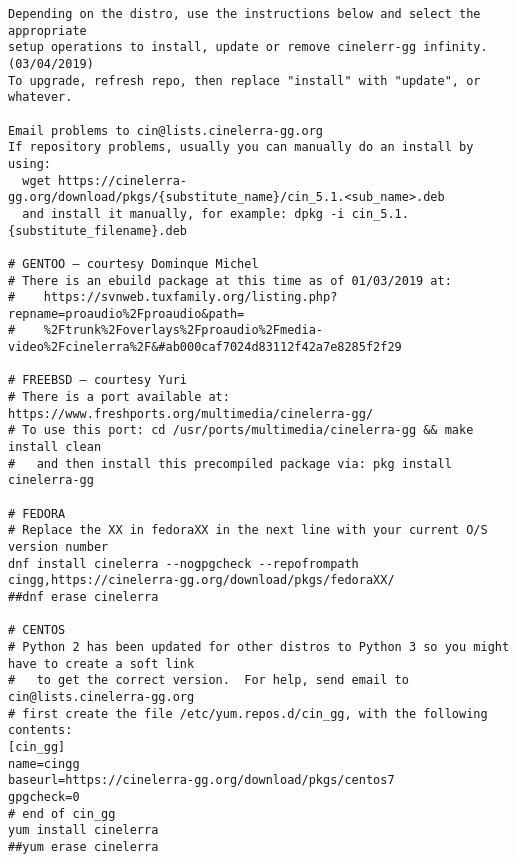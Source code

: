 \begin{lstlisting}
Depending on the distro, use the instructions below and select the appropriate 
setup operations to install, update or remove cinelerr-gg infinity.  (03/04/2019)
To upgrade, refresh repo, then replace "install" with "update", or whatever.

Email problems to cin@lists.cinelerra-gg.org
If repository problems, usually you can manually do an install by using:
  wget https://cinelerra-gg.org/download/pkgs/{substitute_name}/cin_5.1.<sub_name>.deb
  and install it manually, for example: dpkg -i cin_5.1.{substitute_filename}.deb

# GENTOO – courtesy Dominque Michel
# There is an ebuild package at this time as of 01/03/2019 at:
#    https://svnweb.tuxfamily.org/listing.php?repname=proaudio%2Fproaudio&path=
#    %2Ftrunk%2Foverlays%2Fproaudio%2Fmedia-video%2Fcinelerra%2F&#ab000caf7024d83112f42a7e8285f2f29

# FREEBSD – courtesy Yuri
# There is a port available at: https://www.freshports.org/multimedia/cinelerra-gg/
# To use this port: cd /usr/ports/multimedia/cinelerra-gg && make install clean
#   and then install this precompiled package via: pkg install cinelerra-gg

# FEDORA
# Replace the XX in fedoraXX in the next line with your current O/S version number
dnf install cinelerra --nogpgcheck --repofrompath cingg,https://cinelerra-gg.org/download/pkgs/fedoraXX/
##dnf erase cinelerra

# CENTOS
# Python 2 has been updated for other distros to Python 3 so you might have to create a soft link
#   to get the correct version.  For help, send email to cin@lists.cinelerra-gg.org
# first create the file /etc/yum.repos.d/cin_gg, with the following contents:
[cin_gg]
name=cingg
baseurl=https://cinelerra-gg.org/download/pkgs/centos7
gpgcheck=0
# end of cin_gg
yum install cinelerra
##yum erase cinelerra


\end{lstlisting}
